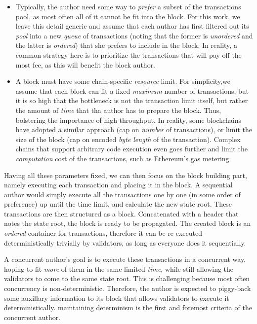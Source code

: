 \begin{itemize}
	\item Typically, the author need some way to \textit{prefer} a subset of the transactions pool,
	as most often all of it cannot be fit into the block. For this work, we leave this detail
	generic and assume that each author has first filtered out its \textit{pool} into a new
	\textit{queue} of transactions (noting that the former is \textit{unordered} and the latter is
	\textit{ordered}) that she prefers to include in the block. In reality, a common strategy here
	is to prioritize the transactions that will pay off the most fee, as this will benefit the block
	author.
	\item A block must have some chain-specific \textit{resource} limit. For simplicity,we assume
	that each block can fit a fixed \textit{maximum} number of transactions, but it is so high that
	the bottleneck is not the transaction limit itself, but rather the amount of \textit{time} that
	tha author has to prepare the block. Thus, bolstering the importance of high throughput. In
	reality, some blockchains have adopted a similar approach (cap on \textit{number} of
	transactions), or limit the size of the block (cap on encoded \textit{byte length} of the
	transaction). Complex chains that support arbitrary code execution even goes further and
	limit the \textit{computation} cost of the transactions, such as Ethereum's gas
	metering\cite{perezBrokenMetreAttacking2020}.
\end{itemize}

Having all these parameters fixed, we can then focus on the block building part, namely executing
each transaction and placing it in the block. A sequential author would simply execute all the
transactions one by one (in some order of preference) up until the time limit, and calculate the new
state root. These transactions are then structured as a block. Concatenated with a header that notes
the state root, the block is ready to be propagated. The created block is an \textit{ordered}
container for transactions, therefore it can be re-executed deterministically trivially by
validators, as long as everyone does it sequentially.

A concurrent author's goal is to execute these transactions in a concurrent way, hoping to fit
\textit{more} of them in the same limited \textit{time}, while still allowing the validators to come
to the same state root. This is challenging because most often concurrency is non-deterministic.
Therefore, the author is expected to piggy-back some auxillary information to its block that allows
validators to execute it deterministically. maintaining determinism is the first and foremost
criteria of the concurrent author.

